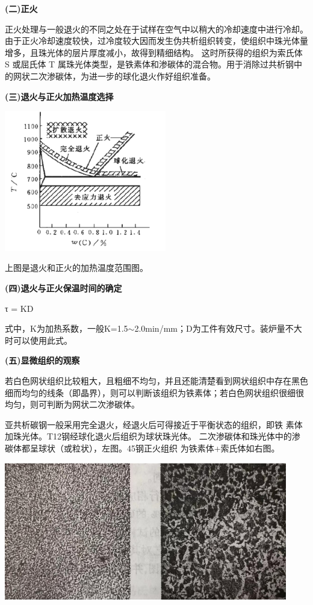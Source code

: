 \documentclass[a4paper,utf8]{article}
\begin{document}
\textbf{(二)正火}

正火处理与一般退火的不同之处在于试样在空气中以稍大的冷却速度中进行冷却。由于正火冷却速度较快，过冷度较大因而发生伪共析组织转变，使组织中珠光体量增多，且珠光体的层片厚度减小，故得到精细结构。
这时所获得的组织为索氏体 S 或屈氏体 T 属珠光体类型，是铁素体和渗碳体的混合物。用于消除过共析钢中的网状二次渗碳体，为进一步的球化退火作好组织准备。

\textbf{(三)退火与正火加热温度选择}

\begin{center}
    \includegraphics[width=200pt]{1.png}
\end{center}

上图是退火和正火的加热温度范围图。

\textbf{(四)退火与正火保温时间的确定 }

 τ = KD

式中，K为加热系数，一般K=1.5$\sim$2.0min/mm；D为工件有效尺寸。装炉量不大时可以使用此式。


\textbf{(五)显微组织的观察}

若白色网状组织比较粗大，且粗细不均匀，并且还能清楚看到网状组织中存在黑色细而均匀的线条（即晶界），则可以判断该组织为铁素体；若白色网状组织很细很均匀，则可判断为网状二次渗碳体。

亚共析碳钢一般采用完全退火，经退火后可得接近于平衡状态的组织，即铁
素体加珠光体。T12钢经球化退火后组织为球状珠光体。
二次渗碳体和珠光体中的渗碳体都呈球状（或粒状），左图。45钢正火组织
为铁素体+索氏体如右图。
\begin{center}
    \includegraphics[width=350pt]{2.png}
\end{center}
\end{document}
